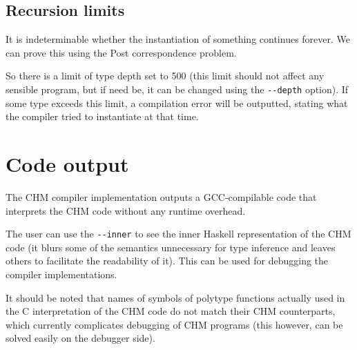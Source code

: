 \subsection{Recursion limits}

It is indeterminable whether the instantiation of something continues forever. We can prove this using the Post correspondence problem. %

So there is a limit of type depth set to 500 (this limit should not affect any sensible program, but if need be, it can be changed using the \lstinline[language=sh]{--depth} option). If some type exceeds this limit, a compilation error will be outputted, stating what the compiler tried to instantiate at that time.

\section{Code output}

The CHM compiler implementation outputs a GCC-compilable code that interprets the CHM code without any runtime overhead.

The user can use the \lstinline[language=sh]{--inner} to see the inner Haskell representation of the CHM code (it blurs some of the semantics unnecessary for type inference and leaves others to facilitate the readability of it). This can be used for debugging the compiler implementations.

It should be noted that names of symbols of polytype functions actually used in the C interpretation of the CHM code do not match their CHM counterparts, which currently complicates debugging of CHM programs (this however, can be solved easily on the debugger side).
